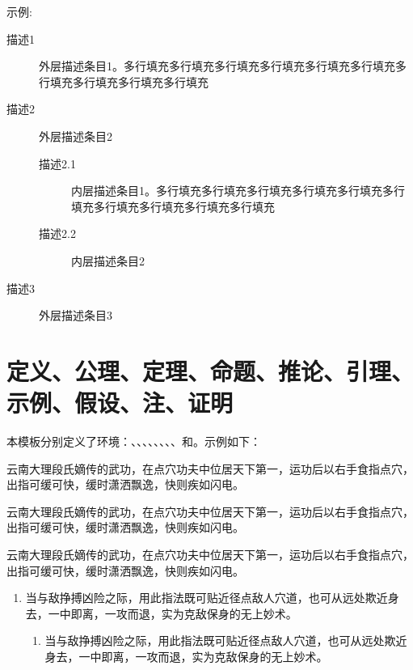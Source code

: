 \documentclass[doctor, vlined, ]{DissertUESTC}
\begin{document}
	\null

	示例:

	\begin{description}
		\item[描述1] 外层描述条目1。多行填充多行填充多行填充多行填充多行填充多行填充多行填充多行填充多行填充多行填充
		\item[描述2] 外层描述条目2
		\begin{description}
			\item[描述2.1] 内层描述条目1。多行填充多行填充多行填充多行填充多行填充多行填充多行填充多行填充多行填充多行填充
			\item[描述2.2] 内层描述条目2
		\end{description}
		\item[描述3] 外层描述条目3
	\end{description}
	
	\clearpage
	\section{定义、公理、定理、命题、推论、引理、示例、假设、注、证明}
	
	本模板分别定义了环境：、、、、、、、、和。示例如下：
	

	\begin{definition}[具体名称]
		云南大理段氏嫡传的武功，在点穴功夫中位居天下第一，运功后以右手食指点穴，出指可缓可快，缓时潇洒飘逸，快则疾如闪电。
	\end{definition}

	\begin{axiom}[具体名称]
		云南大理段氏嫡传的武功，在点穴功夫中位居天下第一，运功后以右手食指点穴，出指可缓可快，缓时潇洒飘逸，快则疾如闪电。
	\end{axiom}
	
	\begin{theorem}[具体名称]
		云南大理段氏嫡传的武功，在点穴功夫中位居天下第一，运功后以右手食指点穴，出指可缓可快，缓时潇洒飘逸，快则疾如闪电。

		\begin{enumerate}
			\item 当与敌挣搏凶险之际，用此指法既可贴近径点敌人穴道，也可从远处欺近身去，一中即离，一攻而退，实为克敌保身的无上妙术。
			\begin{enumerate}
				\item 当与敌挣搏凶险之际，用此指法既可贴近径点敌人穴道，也可从远处欺近身去，一中即离，一攻而退，实为克敌保身的无上妙术。
			\end{enumerate}
		\end{enumerate}
	\end{theorem}
	
\end{document}
